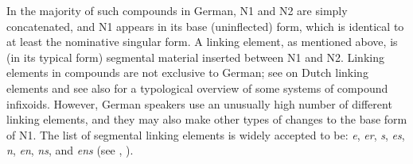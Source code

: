 In the majority of such compounds in German, N1 and N2 are simply concatenated, and N1 appears in its base (uninflected) form, which is identical to at least the nominative singular form.
A linking element, as mentioned above, is (in its typical form) segmental material inserted between N1 and N2.
Linking elements in compounds are not exclusive to German; see \textcite{SchreuderEa1998,BangaEa2013a,BangaEa2013b} on Dutch linking elements and see also \textcite[27]{KrottEa2007} for a typological overview of some systems of compound infixoids.
However, German speakers use an unusually high number of different linking elements, and they may also make other types of changes to the base form of N1.%
The list of segmental linking elements is widely accepted to be: \textit{e}, \textit{er}, \textit{s}, \textit{es}, \textit{n}, \textit{en}, \textit{ns}, and \textit{ens} (see \citealt[31]{Neef2015}, \citealt{KrottEa2007}).
